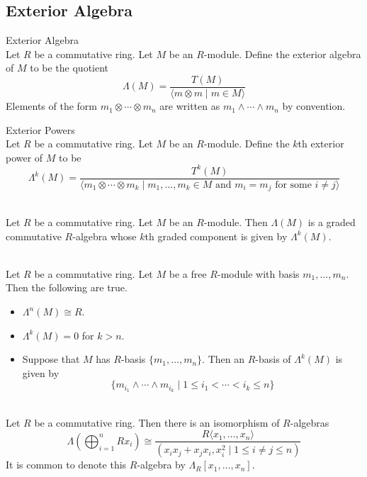 \documentclass[a4paper]{article}
\begin{document}
\subsection{Exterior Algebra}
\begin{defn}{Exterior Algebra}{}\\
Let $R$ be a commutative ring. Let $M$ be an $R$-module. Define the exterior algebra of $M$ to be the quotient $$\Lambda(M)=\frac{T(M)}{\langle m\otimes m\;|\;m\in M\rangle}$$ Elements of the form $m_1\otimes\cdots\otimes m_n$ are written as $m_1\wedge\cdots\wedge m_n$ by convention. 
\end{defn}

\begin{defn}{Exterior Powers}{}\\
Let $R$ be a commutative ring. Let $M$ be an $R$-module. Define the $k$th exterior power of $M$ to be $$\Lambda^k(M)=\frac{T^k(M)}{\langle m_1\otimes\cdots\otimes m_k\;|\;m_1,\dots,m_k\in M\text{ and }m_i=m_j\text{ for some }i\neq j\rangle}$$
\end{defn}

\begin{lmm}{}{}\\
Let $R$ be a commutative ring. Let $M$ be an $R$-module. Then $\Lambda(M)$ is a graded commutative $R$-algebra whose $k$th graded component is given by $\Lambda^k(M)$. 
\end{lmm}

\begin{lmm}{}{}\\
Let $R$ be a commutative ring. Let $M$ be a free $R$-module with basis $m_1,\dots,m_n$. Then the following are true. 
\begin{itemize}
\item $\Lambda^n(M)\cong R$. 
\item $\Lambda^k(M)=0$ for $k>n$. 
\item Suppose that $M$ has $R$-basis $\{m_1,\dots,m_n\}$. Then an $R$-basis of $\Lambda^k(M)$ is given by $$\{m_{i_1}\wedge\cdots\wedge m_{i_k}\;|\;1\leq i_1<\cdots<i_k\leq n\}$$
\end{itemize}
\end{lmm}

\begin{eg}{}{}\\
Let $R$ be a commutative ring. Then there is an isomorphism of $R$-algebras $$\Lambda\left(\bigoplus_{i=1}^nRx_i\right)\cong\frac{R\langle x_1,\dots,x_n\rangle}{(x_ix_j+x_jx_i,x_i^2\;|\;1\leq i\neq j\leq n)}$$ It is common to denote this $R$-algebra by $\Lambda_R[x_1,\dots,x_n]$. 
\end{eg}
\end{document}
